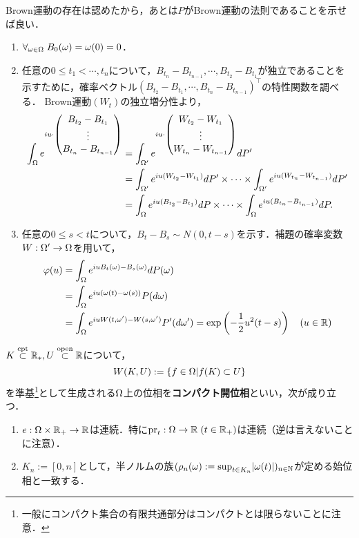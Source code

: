 \documentclass[uplatex,dvipdfmx]{jsreport}
\begin{document}
\begin{Proof}
\begin{enumerate}
        Brown運動の存在は認めたから，あとは$P$がBrown運動の法則であることを示せば良い．
        \begin{enumerate}[({B}1)]
            \item $\forall_{\omega\in\Omega}\;B_0(\omega)=\omega(0)=0$．
            \item 任意の$0\le t_1<\cdots,t_n$について，$B_{t_n}-B_{t_{n-1}},\cdots,B_{t_2}-B_{t_1}$が独立であることを示すために，確率ベクトル$(B_{t_2}-B_{t_1},\cdots,B_{t_n}-B_{t_{n-1}})^\top$の特性関数を調べる．
            Brown運動$(W_t)$の独立増分性より，
            \begin{align*}
                \int_\Omega e^{iu\cdot \begin{pmatrix}B_{t_2}-B_{t_1}\\\vdots\\B_{t_n}-B_{t_{n-1}}\end{pmatrix}}&=\int_{\Omega'}e^{iu\cdot \begin{pmatrix}W_{t_2}-W_{t_1}\\\vdots\\W_{t_n}-W_{t_{n-1}}\end{pmatrix}}dP'\\
                &=\int_{\Omega'}e^{iu(W_{t_2}-W_{t_1})}dP'\times\cdots\times\int_{\Omega'}e^{iu(W_{t_n}-W_{t_{n-1}})}dP'\\
                &=\int_\Omega e^{iu(B_{t_2}-B_{t_1})}dP\times\cdots\times\int_\Omega e^{iu(B_{t_n}-B_{t_{n-1}})}dP.
            \end{align*}
            \item 任意の$0\le s<t$について，$B_t-B_s\sim N(0,t-s)$を示す．補題の確率変数$W:\Omega'\to\Omega$を用いて，
            \begin{align*}
                \varphi(u)&=\int_\Omega e^{iuB_t(\omega)-B_s(\omega)}dP(\omega)\\
                &=\int_\Omega e^{iu(\omega(t)-\omega(s))}P(d\omega)\\
                &=\int_\Omega e^{iu W(t,\omega')-W(s,\omega')}P'(d\omega')=\exp\left(-\frac{1}{2}u^2(t-s)\right)\quad(u\in\mathbb{R})
            \end{align*}
        \end{enumerate}
    \end{enumerate}
\end{Proof}

\begin{lemma}[コンパクト開位相の性質]
    $K\overset{\textrm{cpt}}{\subset}\mathbb{R}_*,U\overset{\mathrm{open}}{\subset}\mathbb{R}$について，
    \[W(K,U):=\left\{f\in\Omega| f(K)\subset U\right\}\]
    を準基\footnote{一般にコンパクト集合の有限共通部分はコンパクトとは限らないことに注意．}として生成される$\Omega$上の位相を\textbf{コンパクト開位相}といい，次が成り立つ．
    \begin{enumerate}
        \item $e:\Omega\times\mathbb{R}_+\to\mathbb{R}$は連続．特に$\mathrm{pr}_t:\Omega\to\mathbb{R}\;(t\in\mathbb{R}_+)$は連続（逆は言えないことに注意）．
        \item $K_n:=[0,n]$として，半ノルムの族$(\rho_n(\omega):=\sup_{t\in K_n}\lvert\omega(t)\rvert)_{n\in\mathbb{N}}$が定める始位相と一致する．
    \end{enumerate}
\end{lemma}
\end{document}
